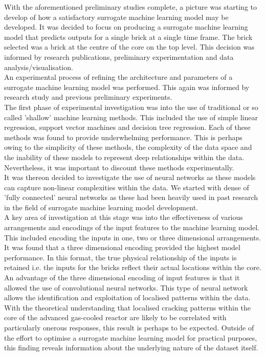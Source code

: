  \noindent With the aforementioned preliminary studies complete, a picture was starting to develop of how a satisfactory surrogate machine learning model may be developed. It was decided to focus on producing a surrogate machine learning model that predicts outputs for a single brick at a single time frame. The brick selected was a brick at the centre of the core on the top level. This decision was informed by research publications, preliminary experimentation and data analysis/visualisation.  \\
 
 \noindent
 An experimental process of refining the architecture and parameters of a surrogate machine learning model was performed. This again was informed by research study and previous preliminary experiments. \\
 
 \noindent
 The first phase of experimental investigation was into the use of traditional or so called 'shallow' machine learning methods. This included the use of simple linear regression, support vector machines and decision tree regression. Each of these methods was found to provide underwhelming performance. This is perhaps owing to the simplicity of these methods, the complexity of the data space and the inability of these models to represent deep relationships within the data. Nevertheless, it was important to discount these methods experimentally. \\
 
 \noindent It was thereon decided to investigate the use of neural networks as these models can capture non-linear complexities within the data. We started with dense of 'fully connected' neural networks as these had been heavily used in past research in the field of surrogate machine learning model development. \\ 
 
 \noindent
 A key area of investigation at this stage was into the effectiveness of various arrangements and encodings of the input features to the machine learning model. This included encoding the inputs in one, two or three dimensional arrangements. It was found that a three dimensional encoding provided the highest model performance. In this format, the true physical relationship of the inputs is retained i.e. the inputs for the bricks reflect their actual locations within the core. \\
 
 \noindent
 An advantage of the three dimensional encoding of input features is that it allowed the use of convolutional neural networks. This type of neural network allows the identification and exploitation of localised patterns within the data. With the theoretical understanding that localised cracking patterns within the core of the advanced gas-cooled reactor are likely to be correlated with particularly onerous responses, this result is perhaps to be expected. Outside of the effort to optimise a surrogate machine learning model for practical purposes, this finding reveals information about the underlying nature of the dataset itself.  \\
 
